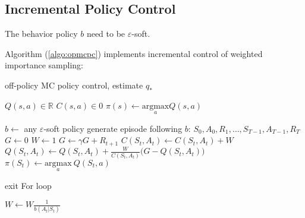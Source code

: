 \subsection{Incremental Policy Control}

The behavior policy $b$ need to be $\varepsilon$-soft.

Algorithm (\ref{algo:opmcpc}) implements incremental control of weighted importance sampling:

\begin{algorithm}
	\caption{off-policy MC policy control, estimate $q_*$}\label{algo:opmcpc}	
	
	\begin{algorithmic}[1]
		\State $Q(s,a) \in \mathbb{R}$
		\State $C(s,a) \in 0$
		\State $\pi(s) \gets \underset{a}{\text{argmax}} Q(s,a)$
		
		\Statex
		
		\Loop
			\State $b \gets $ any $\varepsilon$-soft policy
			\State generate episode following $b$: $S_0, A_0,R_1, \dots, S_{T-1},A_{T-1},R_T$
			\State $G \gets 0$
			\State $W \gets 1$
				\State $G \gets \gamma G + R_{t+1}$
				\State $C(S_t,A_t) \gets C(S_t,A_t) + W$ 
				\State $Q(S_t,A_t) \gets Q(S_t,A_t) + \frac{W}{C(S_t,A_t)} \Big( G - Q(S_t,A_t) \Big)$
				\State $\pi(S_t) \gets \underset{a}{\text{argmax}}\  Q(S_t,a)$
				
					\State exit  For loop
				\EndIf
				
				\State $W \gets W \frac{1}{b(A_t|S_t)}$ 
			\EndFor
		\EndLoop
	\end{algorithmic}
\end{algorithm}


